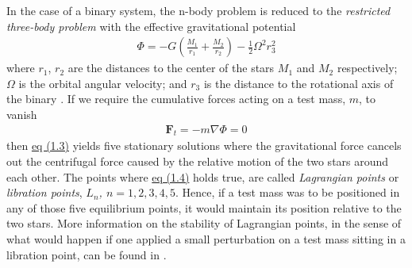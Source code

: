 \documentclass[../../main/thesis_msc.tex]{subfiles}
\begin{document}
				In the case of a binary system, the n-body problem is reduced to the \emph{restricted three-body problem} with the effective gravitational potential 
					\begin{eqnarray}
						\label{eq:eff_potential}
						\Phi = -G \left( \frac{M_1}{r_1} + \frac{M_2}{r_2} \right) - \frac{1}{2} \Omega^2 r_3^2
					\end{eqnarray}
					where $r_1$, $r_2$ are the distances to the center of the stars $M_1$ and $M_2$ respectively; $\Omega$ is the orbital angular velocity; and $r_3$ is the distance to the rotational axis of the binary \citep[p.~639]{Tauris_2006}. If we require the cumulative forces acting on a test mass, $m$, to vanish
					\begin{eqnarray}
						\label{eq:cum_force}
						\pmb{F}_t = -m \nabla \Phi = 0
					\end{eqnarray}
				then \hyperref[eq:eff_potential]{eq (1.3)} yields five stationary solutions where the gravitational force cancels out the centrifugal force caused by the relative motion of the two stars around each other. The points where \hyperref[eq:cum_force]{eq (1.4)} holds true, are called \emph{Lagrangian points} or \emph{libration points}, \emph{$L_n$, $n=1,2,3,4,5$}. Hence, if a test mass was to be positioned in any of those five equilibrium points, it would maintain its position relative to the two stars. More information on the stability of Lagrangian points, in the sense of what would happen if one applied a small perturbation on a test mass sitting in a libration point, can be found in \cite{Szebehely, Celletti1990, Schwarz2012}.
				
\end{document}
